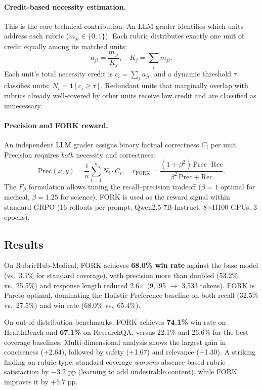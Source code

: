 \documentclass[11pt,a4paper]{article}
\begin{document}
\paragraph{Credit-based necessity estimation.} This is the core technical contribution. An LLM grader identifies which units address each rubric ($m_{ji} \in \{0,1\}$). Each rubric distributes exactly one unit of credit equally among its matched units:
\begin{equation}
  a_{ji} = \frac{m_{ji}}{K_j}, \quad K_j = \textstyle\sum_i m_{ji}.
\end{equation}
Each unit's total necessity credit is $c_i = \sum_j a_{ji}$, and a dynamic threshold $\tau$ classifies units: $N_i = \mathbf{1}[c_i \geq \tau]$. Redundant units that marginally overlap with rubrics already well-covered by other units receive low credit and are classified as unnecessary.

\paragraph{Precision and FORK reward.} An independent LLM grader assigns binary factual correctness $C_i$ per unit. Precision requires \emph{both} necessity and correctness:
\begin{equation}
  \mathrm{Prec}(x, y) = \frac{1}{n}\sum_{i=1}^n N_i \cdot C_i, \quad r_{\mathrm{FORK}} = \frac{(1 + \beta^2)\,\mathrm{Prec} \cdot \mathrm{Rec}}{\beta^2\,\mathrm{Prec} + \mathrm{Rec}}.
\end{equation}
The $F_\beta$ formulation allows tuning the recall--precision tradeoff ($\beta = 1$ optimal for medical, $\beta = 1.25$ for science). FORK is used as the reward signal within standard GRPO (16 rollouts per prompt, Qwen2.5-7B-Instruct, 8$\times$H100 GPUs, 3 epochs).

\subsection{Results}
On RubricHub-Medical, FORK achieves \textbf{68.0\% win rate} against the base model (vs.\ 3.1\% for standard coverage), with precision more than doubled (53.2\% vs.\ 25.5\%) and response length reduced 2.6$\times$ (9,195 $\to$ 3,533 tokens). FORK is Pareto-optimal, dominating the Holistic Preference baseline on both recall (32.5\% vs.\ 27.5\%) and win rate (68.0\% vs.\ 65.4\%).

On out-of-distribution benchmarks, FORK achieves \textbf{74.1\%} win rate on HealthBench and \textbf{67.1\%} on ResearchQA, versus 22.1\% and 26.6\% for the best coverage baselines. Multi-dimensional analysis shows the largest gain in conciseness (+2.64), followed by safety (+1.67) and relevance (+1.30). A striking finding on rubric type: standard coverage \emph{worsens} absence-based rubric satisfaction by $-3.2$ pp (learning to add undesirable content), while FORK improves it by $+5.7$ pp.
\end{document}
